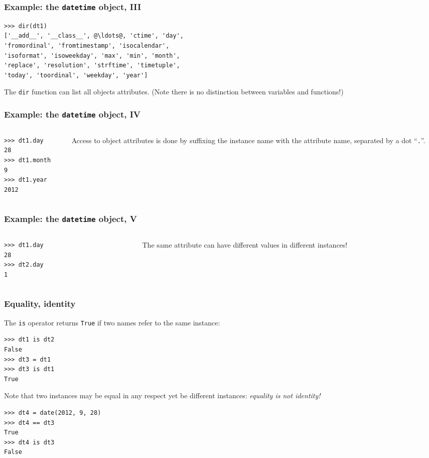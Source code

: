 \documentclass[english,serif,mathserif,xcolor=pdftex,dvipsnames,table]{beamer}
\begin{document}
\begin{frame}[fragile]
  \frametitle{Example: the \texttt{datetime} object, III}
\begin{lstlisting}
>>> dir(dt1)
['__add__', '__class__', @\ldots@, 'ctime', 'day', 
'fromordinal', 'fromtimestamp', 'isocalendar', 
'isoformat', 'isoweekday', 'max', 'min', 'month', 
'replace', 'resolution', 'strftime', 'timetuple', 
'today', 'toordinal', 'weekday', 'year']
\end{lstlisting}

  \+
  The \texttt{dir} function can list all objects attributes.
  (Note there is no distinction between variables and functions!)
\end{frame}


\begin{frame}[fragile]
  \frametitle{Example: the \texttt{datetime} object, IV}
  \begin{columns}[c]
    \begin{column}{0.5\textwidth}
\begin{lstlisting}
>>> dt1.day
28
>>> dt1.month
9
>>> dt1.year
2012
\end{lstlisting}
    \end{column}
    \begin{column}{0.5\textwidth}
      \raggedleft 
      Access to object attributes is done by suffixing the
      instance name with the attribute name, separated by a dot
      ``\texttt{.}''.
    \end{column}
  \end{columns}
\end{frame}


\begin{frame}[fragile]
  \frametitle{Example: the \texttt{datetime} object, V}
  \begin{columns}[c]
    \begin{column}{0.5\textwidth}
\begin{lstlisting}
>>> dt1.day
28
>>> dt2.day
1
\end{lstlisting}
    \end{column}
    \begin{column}{0.5\textwidth}
      \raggedleft 
      The same attribute can have different 
      values in different instances!
    \end{column}
  \end{columns}
\end{frame}


\begin{frame}
  \frametitle{Equality, identity}
  The \texttt{is} operator returns \texttt{True} if two names refer to
  the same instance:
\begin{lstlisting}
>>> dt1 is dt2
False
>>> dt3 = dt1
>>> dt3 is dt1
True
\end{lstlisting}

  \+ 
  Note that two instances may be equal in any respect yet be
  different instances: \emph{equality is not identity!}
\begin{lstlisting}
>>> dt4 = date(2012, 9, 28)
>>> dt4 == dt3
True
>>> dt4 is dt3
False
\end{lstlisting}
\end{frame}
\end{document}
